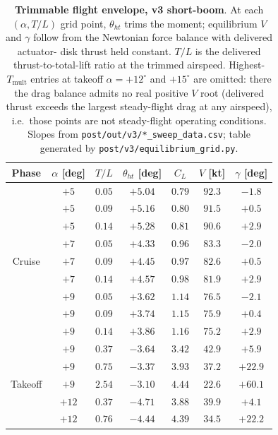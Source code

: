 \documentclass[conf]{new-aiaa}
\begin{document}
\begin{table}[htb!]
\centering
\small
\caption{\textbf{Trimmable flight envelope, v3 short-boom}.  At
         each $(\alpha, T/L)$ grid point, $\theta_{ht}$ trims
         the moment; equilibrium $V$ and $\gamma$ follow from
         the Newtonian force balance with delivered actuator-
         disk thrust held constant.  $T/L$ is the delivered
         thrust-to-total-lift ratio at the trimmed airspeed.
         Highest-$T_{\mathrm{mult}}$ entries at takeoff
         $\alpha=+12^\circ$ and $+15^\circ$ are omitted: there
         the drag balance admits no real positive $V$ root
         (delivered thrust exceeds the largest steady-flight
         drag at any airspeed), i.e.\ those points are not
         steady-flight operating conditions.  Slopes from
         \texttt{post/out/v3/*\_sweep\_data.csv}; table
         generated by \texttt{post/v3/equilibrium\_grid.py}.}
\label{tab:v3-envelope}
\begin{tabular}{ccccccc}
\toprule
Phase & $\alpha$ [deg] & $T/L$ & $\theta_{ht}$ [deg]
   & $C_L$  & $V$ [kt] & $\gamma$ [deg] \\
\midrule
\multirow{9}{*}{Cruise}
  & $+5$ & $0.05$ & $+5.04$ & $0.79$ & $92.3$ & $-1.8$  \\
  & $+5$ & $0.09$ & $+5.16$ & $0.80$ & $91.5$ & $+0.5$  \\
  & $+5$ & $0.14$ & $+5.28$ & $0.81$ & $90.6$ & $+2.9$  \\
  & $+7$ & $0.05$ & $+4.33$ & $0.96$ & $83.3$ & $-2.0$  \\
  & $+7$ & $0.09$ & $+4.45$ & $0.97$ & $82.6$ & $+0.5$  \\
  & $+7$ & $0.14$ & $+4.57$ & $0.98$ & $81.9$ & $+2.9$  \\
  & $+9$ & $0.05$ & $+3.62$ & $1.14$ & $76.5$ & $-2.1$  \\
  & $+9$ & $0.09$ & $+3.74$ & $1.15$ & $75.9$ & $+0.4$  \\
  & $+9$ & $0.14$ & $+3.86$ & $1.16$ & $75.2$ & $+2.9$  \\
\midrule
\multirow{7}{*}{Takeoff}
  & $+9$  & $0.37$ & $-3.64$ & $3.42$ & $42.9$ & $+5.9$  \\
  & $+9$  & $0.75$ & $-3.37$ & $3.93$ & $37.2$ & $+22.9$ \\
  & $+9$  & $2.54$ & $-3.10$ & $4.44$ & $22.6$ & $+60.1$ \\
  & $+12$ & $0.37$ & $-4.71$ & $3.88$ & $39.9$ & $+4.1$  \\
  & $+12$ & $0.76$ & $-4.44$ & $4.39$ & $34.5$ & $+22.2$ \\

\end{tabular}
\end{table}
\end{document}
